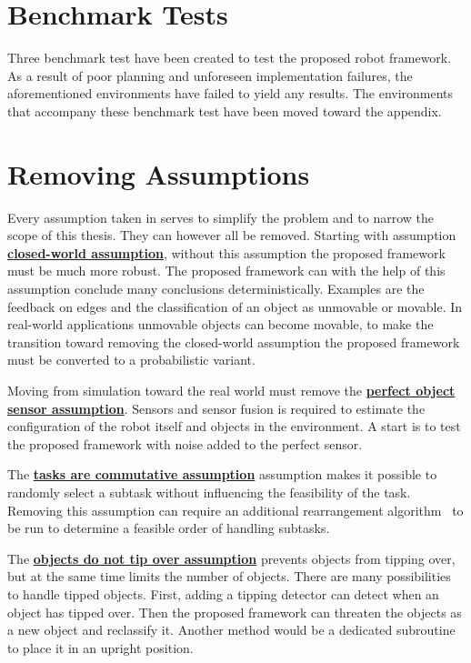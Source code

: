 \section*{Benchmark Tests}
Three benchmark test have been created to test the proposed robot framework. As a result of poor planning and unforeseen implementation failures, the aforementioned environments have failed to yield any results. The environments that accompany these benchmark test have been moved toward the appendix.\bs

\section*{Removing Assumptions}
Every assumption taken in  serves to simplify the problem and to narrow the scope of this thesis. They can however all be removed. Starting with assumption \hyperref[assumption:closed_world]{\textbf{closed-world assumption}}, without this assumption the proposed framework must be much more robust. The proposed framework can with the help of this assumption conclude many conclusions deterministically. Examples are the feedback on edges and the classification of an object as unmovable or movable. In real-world applications unmovable objects can become movable, to make the transition toward removing the closed-world assumption the proposed framework must be converted to a probabilistic variant.\bs

Moving from simulation toward the real world must remove the \hyperref[assumption:perfect_object_sensor]{\textbf{perfect object sensor assumption}}. Sensors and sensor fusion is required to estimate the configuration of the robot itself and objects in the environment. A start is to test the proposed framework with noise added to the perfect sensor.\bs

The \hyperref[assumption:order_does_not_matter]{\textbf{tasks are commutative assumption}} assumption makes it possible to randomly select a subtask without influencing the feasibility of the task. Removing this assumption can require an additional rearrangement algorithm~\cite{krontiris_dealing_2015} to be run to determine a feasible order of handling subtasks.\bs

The \hyperref[assumption:no_tipping]{\textbf{objects do not tip over assumption}} prevents objects from tipping over, but at the same time limits the number of objects. There are many possibilities to handle tipped objects. First, adding a tipping detector can detect when an object has tipped over. Then the proposed framework can threaten the objects as a new object and reclassify it. Another method would be a dedicated subroutine to place it in an upright position.\bs
